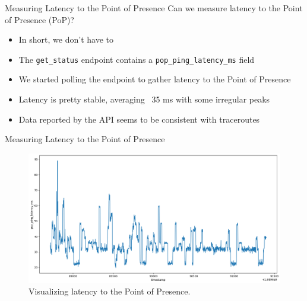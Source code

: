 \documentclass[NET,english,beameralt]{tumbeamer}
\begin{document}
\begin{frame}{Measuring Latency to the Point of Presence}
    Can we measure latency to the Point of Presence (PoP)?
    \begin{itemize}
        \item In short, we don't have to
        \item The \texttt{get\_status} endpoint contains a  \texttt{pop\_ping\_latency\_ms} field
        \item We started polling the endpoint to gather latency to the Point of Presence
        \item Latency is pretty stable, averaging ~35 ms with some irregular peaks
        \item Data reported by the API seems to be consistent with traceroutes
    \end{itemize}
\end{frame}

\begin{frame}{Measuring Latency to the Point of Presence}
    \begin{figure}
        \centering
        \includegraphics[width=1\columnwidth]{pics/latency.png}
        \caption{Visualizing latency to the Point of Presence.}
    \end{figure}
\end{frame}
\end{document}
